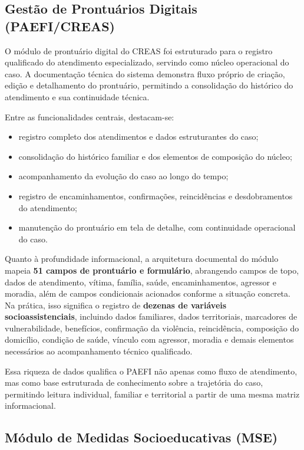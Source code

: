 \documentclass[12pt,a4paper]{article}
\begin{document}
\subsection{Gestão de Prontuários Digitais (PAEFI/CREAS)}

O módulo de prontuário digital do CREAS foi estruturado para o registro qualificado do atendimento especializado, servindo como núcleo operacional do caso. A documentação técnica do sistema demonstra fluxo próprio de criação, edição e detalhamento do prontuário, permitindo a consolidação do histórico do atendimento e sua continuidade técnica.

Entre as funcionalidades centrais, destacam-se:

\begin{itemize}[leftmargin=1.5cm]
\item registro completo dos atendimentos e dados estruturantes do caso;
\item consolidação do histórico familiar e dos elementos de composição do núcleo;
\item acompanhamento da evolução do caso ao longo do tempo;
\item registro de encaminhamentos, confirmações, reincidências e desdobramentos do atendimento;
\item manutenção do prontuário em tela de detalhe, com continuidade operacional do caso.
\end{itemize}

Quanto à profundidade informacional, a arquitetura documental do módulo mapeia \textbf{51 campos de prontuário e formulário}, abrangendo campos de topo, dados de atendimento, vítima, família, saúde, encaminhamentos, agressor e moradia, além de campos condicionais acionados conforme a situação concreta. Na prática, isso significa o registro de \textbf{dezenas de variáveis socioassistenciais}, incluindo dados familiares, dados territoriais, marcadores de vulnerabilidade, benefícios, confirmação da violência, reincidência, composição do domicílio, condição de saúde, vínculo com agressor, moradia e demais elementos necessários ao acompanhamento técnico qualificado.

Essa riqueza de dados qualifica o PAEFI não apenas como fluxo de atendimento, mas como base estruturada de conhecimento sobre a trajetória do caso, permitindo leitura individual, familiar e territorial a partir de uma mesma matriz informacional.

\subsection{Módulo de Medidas Socioeducativas (MSE)}
\end{document}
